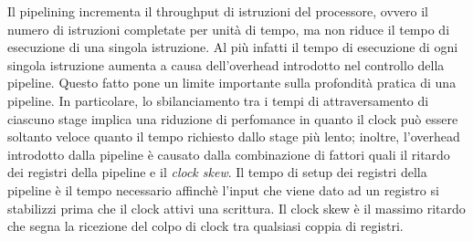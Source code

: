 Il pipelining incrementa il throughput di istruzioni del processore, ovvero il numero di istruzioni completate per unità di tempo, ma non riduce il tempo di esecuzione di una singola istruzione. Al più infatti il tempo di esecuzione di ogni singola istruzione aumenta a causa dell'overhead introdotto nel controllo della pipeline. Questo fatto pone un limite importante sulla profondità pratica di una pipeline. 
In particolare, lo sbilanciamento tra i tempi di attraversamento di ciascuno stage implica una riduzione di perfomance in quanto il clock può essere soltanto veloce quanto il tempo richiesto dallo stage più lento; inoltre, l'overhead introdotto dalla pipeline è causato dalla combinazione di fattori quali il ritardo dei registri della pipeline e il \textit{clock skew}. Il tempo di setup dei registri della pipeline è il tempo necessario affinchè l'input che viene dato ad un registro si stabilizzi prima che il clock attivi una scrittura. Il clock skew è il massimo ritardo che segna la ricezione del colpo di clock tra qualsiasi coppia di registri.


